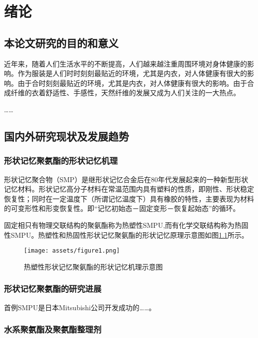 %
%
%

\chapter{绪论}
\label{chap:intro}

\section{本论文研究的目的和意义}

近年来，随着人们生活水平的不断提高，人们越来越注重周围环境对身体健康的影响。作为服装是人们时时刻刻最贴近的环境，尤其是内衣，对人体健康有很大的影响。由于合时刻刻最贴近的环境，尤其是内衣，对人体健康有很大的影响。由于合成纤维的衣着舒适性、手感性，天然纤维的发展又成为人们关注的一大热点。

……

\section{国内外研究现状及发展趋势}

\subsection{形状记忆聚氨酯的形状记忆机理}

形状记忆聚合物（SMP）是继形状记忆合金后在80年代发展起来的一种新型形状记忆材料。形状记忆高分子材料在常温范围内具有塑料的性质，即刚性、形状稳定恢复性；同时在一定温度下（所谓记忆温度下）具有橡胶的特性，主要表现为材料的可变形性和形变恢复性。即“记忆初始态－固定变形－恢复起始态”的循环。

固定相只有物理交联结构的聚氨酯称为热塑性SMPU,而有化学交联结构称为热固性SMPU。热塑性和热固性形状记忆聚氨酯的形状记忆原理示意图如图\ref{fig:diagram}所示。

\begin{figure}
  \centering
  \texttt{[image: assets/figure1.png]}
  \caption{热塑性形状记忆聚氨酯的形状记忆机理示意图}
  \label{fig:diagram}
\end{figure}

\subsection{形状记忆聚氨酯的研究进展}

首例SMPU是日本Mitsubishi公司开发成功的……。

\subsection{水系聚氨酯及聚氨酯整理剂}

